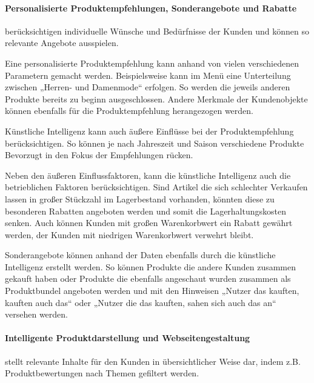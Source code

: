 \paragraph{Personalisierte Produktempfehlungen, Sonderangebote und Rabatte} berücksichtigen individuelle Wünsche und Bedürfnisse der Kunden und können so relevante Angebote ausspielen.\vspace{0.2cm}

Eine personalisierte Produktempfehlung kann anhand von vielen verschiedenen Parametern gemacht werden. Beispielsweise kann im Menü eine Unterteilung zwischen „Herren- und Damenmode“ erfolgen. So werden die jeweils anderen Produkte bereits zu beginn ausgeschlossen. Andere Merkmale der Kundenobjekte können ebenfalls für die Produktempfehlung herangezogen werden.\vspace{0.2cm}

Künstliche Intelligenz kann auch äußere Einflüsse bei der Produktempfehlung berücksichtigen. So können je nach Jahreszeit und Saison verschiedene Produkte Bevorzugt in den Fokus der Empfehlungen rücken.\vspace{0.2cm}

Neben den äußeren Einflussfaktoren, kann die künstliche Intelligenz auch die betrieblichen Faktoren berücksichtigen. Sind Artikel die sich schlechter Verkaufen lassen in großer Stückzahl im  Lagerbestand vorhanden, könnten diese zu besonderen Rabatten angeboten werden und somit die Lagerhaltungskosten senken. Auch können Kunden mit großen Warenkorbwert ein Rabatt gewährt werden, der Kunden mit niedrigen Warenkorbwert verwehrt bleibt.\vspace{0.2cm}

Sonderangebote können anhand der Daten ebenfalls durch die künstliche Intelligenz erstellt werden. So können Produkte die andere Kunden zusammen gekauft haben oder Produkte die ebenfalls angeschaut wurden zusammen als Produktbundel angeboten werden und mit den Hinweisen „Nutzer das kauften, kauften auch das“ oder „Nutzer die das kauften, sahen sich auch das an“ versehen werden.

\paragraph{Intelligente Produktdarstellung und Webseitengestaltung} stellt relevante Inhalte für den Kunden in übersichtlicher Weise dar, indem z.B. Produktbewertungen nach Themen gefiltert werden.\vspace{0.2cm}

